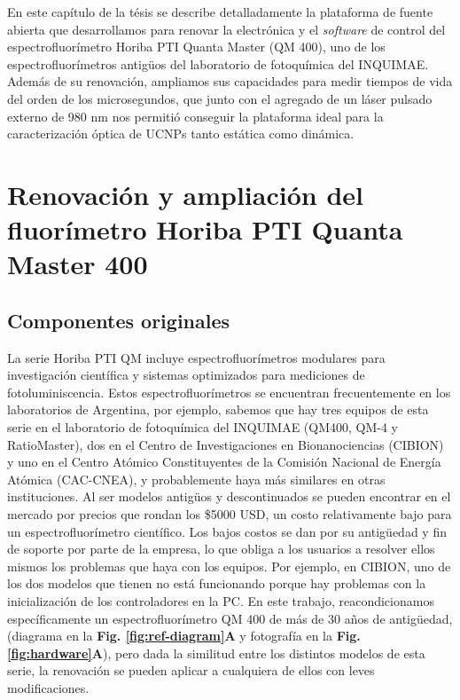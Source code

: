 \renewcommand{\tablename}{\textbf{Tabla}}

En este capítulo de la tésis se describe detalladamente la plataforma de fuente abierta que desarrollamos para renovar la electrónica y el \textit{software} de control del espectrofluorímetro Horiba PTI Quanta Master (QM 400), uno de los espectrofluorímetros antigüos del laboratorio de fotoquímica del INQUIMAE.
Además de su renovación, ampliamos sus capacidades para medir tiempos de vida del orden de los microsegundos, que junto con el agregado de un láser pulsado externo de 980 nm nos permitió conseguir la plataforma ideal para la caracterización óptica de UCNPs tanto estática como dinámica.


\section{Renovación y ampliación del fluorímetro Horiba PTI Quanta Master 400}

\subsection{Componentes originales}

La serie Horiba PTI QM incluye espectrofluorímetros modulares para investigación científica y sistemas optimizados para mediciones de fotoluminiscencia.
Estos espectrofluorímetros se encuentran frecuentemente en los laboratorios de Argentina, por ejemplo, sabemos que hay tres equipos de esta serie en el laboratorio de fotoquímica del INQUIMAE (QM400, QM-4 y RatioMaster), dos en el Centro de Investigaciones en Bionanociencias (CIBION) y uno en el Centro Atómico Constituyentes de la Comisión Nacional de Energía Atómica (CAC-CNEA), y probablemente haya más similares en otras instituciones.
Al ser modelos antigüos y descontinuados se pueden encontrar en el mercado por precios que rondan los \$5000 USD, un costo relativamente bajo para un espectrofluorímetro científico.
Los bajos costos se dan por su antigüedad y fin de soporte por parte de la empresa, lo que obliga a los usuarios a resolver ellos mismos los problemas que haya con los equipos.
Por ejemplo, en CIBION, uno de los dos modelos que tienen no está funcionando porque hay problemas con la inicialización de los controladores en la PC.
En este trabajo, reacondicionamos específicamente un espectrofluorímetro QM 400 de más de 30 años de antigüedad,  (diagrama en la \textbf{Fig. \ref{fig:ref-diagram}A} y fotografía en la \textbf{Fig. \ref{fig:hardware}A}), pero dada la similitud entre los distintos modelos de esta serie, la renovación se pueden aplicar a cualquiera de ellos con leves modificaciones. 

